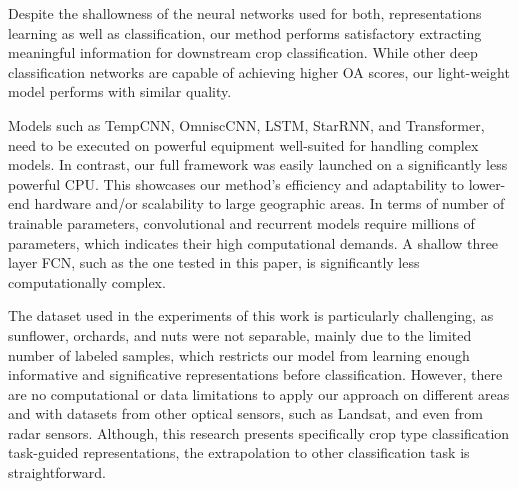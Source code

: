 \documentclass[journal,article,submit,pdftex,moreauthors]{Definitions/mdpi}
\begin{document}

Despite the shallowness of the neural networks used for both, representations learning as well as classification, our method performs satisfactory extracting meaningful information for downstream crop classification. 
While other deep classification networks are capable of achieving higher OA scores, our light-weight model performs with similar quality.

Models such as TempCNN, OmniscCNN, LSTM, StarRNN, and Transformer, need to be executed on powerful equipment well-suited for handling complex models. In contrast, our full framework was easily launched on a significantly less powerful CPU. This showcases our method's efficiency and adaptability to lower-end hardware and/or scalability to large geographic areas.
In terms of number of trainable parameters, convolutional and recurrent models require millions of parameters, which indicates their high computational demands. A shallow three layer FCN, such as the one tested in this paper, is significantly less computationally complex.



The dataset used in the experiments of this work is particularly challenging, as sunflower, orchards, and nuts were not separable, mainly due to the limited number of labeled samples, which restricts our model from learning enough informative and significative representations before classification.
However, there are no computational or data limitations to apply our approach on different areas and with datasets from other optical sensors, such as Landsat, and even from radar sensors.
Although, this research presents specifically crop type classification task-guided representations, the extrapolation to other classification task is straightforward.
\end{document}
